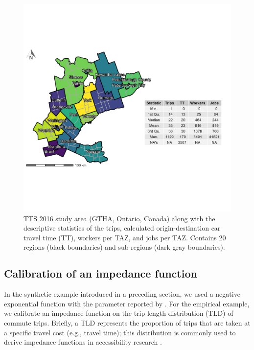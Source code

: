 \documentclass[]{elsarticle} %
\begin{document}
\begin{figure}

{\centering \includegraphics[width=0.8\linewidth]{images/TTS16-survey-area} 

}

\caption{\label{fig:TTS-16-survey-area}TTS 2016 study area (GTHA, Ontario, Canada) along with the descriptive statistics of the trips, calculated origin-destination car travel time (TT), workers per TAZ, and jobs per TAZ. Contains 20 regions (black boundaries) and sub-regions (dark gray boundaries).}\label{fig:TTS-16-survey-area}
\end{figure}

\hypertarget{calibration-of-an-impedance-function}{%
\subsection{Calibration of an impedance
function}\label{calibration-of-an-impedance-function}}

In the synthetic example introduced in a preceding section, we used a
negative exponential function with the parameter reported by
\citet{shen1998}. For the empirical example, we calibrate an impedance
function on the trip length distribution (TLD) of commute trips.
Briefly, a TLD represents the proportion of trips that are taken at a
specific travel cost (e.g., travel time); this distribution is commonly
used to derive impedance functions in accessibility research
\citep{lopez_2017_spatial, horbachov_theoretical_2018, batista_estimation_2019}.
\end{document}
